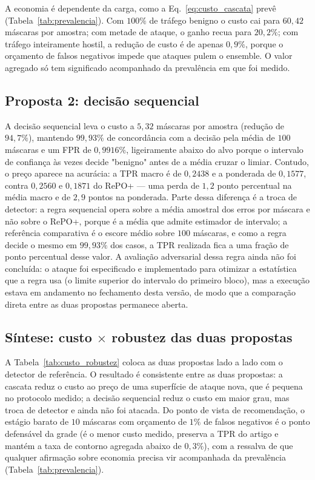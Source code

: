 \documentclass[conference]{IEEEtran}
\begin{document}
A economia é dependente da carga, como a Eq.~\eqref{eq:custo_cascata} prevê (Tabela~\ref{tab:prevalencia}).
Com $100\%$ de tráfego benigno o custo cai para $60{,}42$ máscaras por amostra; com metade de ataque, o ganho recua para $20{,}2\%$; com tráfego inteiramente hostil, a redução de custo é de apenas $0{,}9\%$, porque o orçamento de falsos negativos impede que ataques pulem o ensemble.
O valor agregado só tem significado acompanhado da prevalência em que foi medido.

\subsection{Proposta 2: decisão sequencial}

A decisão sequencial leva o custo a $5{,}32$ máscaras por amostra (redução de $94{,}7\%$), mantendo $99{,}93\%$ de concordância com a decisão pela média de $100$ máscaras e um FPR de $0{,}9916\%$, ligeiramente abaixo do alvo porque o intervalo de confiança às vezes decide "benigno" antes de a média cruzar o limiar.
Contudo, o preço aparece na acurácia: a TPR macro é de $0{,}2438$ e a ponderada de $0{,}1577$, contra $0{,}2560$ e $0{,}1871$ do RePO+ — uma perda de $1{,}2$ ponto percentual na média macro e de $2{,}9$ pontos na ponderada.
Parte dessa diferença é a troca de detector: a regra sequencial opera sobre a média amostral dos erros por máscara e não sobre o RePO+, porque é a média que admite estimador de intervalo; a referência comparativa é o escore médio sobre $100$ máscaras, e como a regra decide o mesmo em $99{,}93\%$ dos casos, a TPR realizada fica a uma fração de ponto percentual desse valor.
A avaliação adversarial dessa regra ainda não foi concluída: o ataque foi especificado e implementado para otimizar a estatística que a regra usa (o limite superior do intervalo do primeiro bloco), mas a execução estava em andamento no fechamento desta versão, de modo que a comparação direta entre as duas propostas permanece aberta.

\subsection{Síntese: custo $\times$ robustez das duas propostas}

A Tabela~\ref{tab:custo_robustez} coloca as duas propostas lado a lado com o detector de referência.
O resultado é consistente entre as duas propostas: a cascata reduz o custo ao preço de uma superfície de ataque nova, que é pequena no protocolo medido; a decisão sequencial reduz o custo em maior grau, mas troca de detector e ainda não foi atacada.
Do ponto de vista de recomendação, o estágio barato de $10$ máscaras com orçamento de $1\%$ de falsos negativos é o ponto defensável da grade (é o menor custo medido, preserva a TPR do artigo e mantém a taxa de contorno agregada abaixo de $0{,}3\%$), com a ressalva de que qualquer afirmação sobre economia precisa vir acompanhada da prevalência (Tabela~\ref{tab:prevalencia}).
\end{document}
